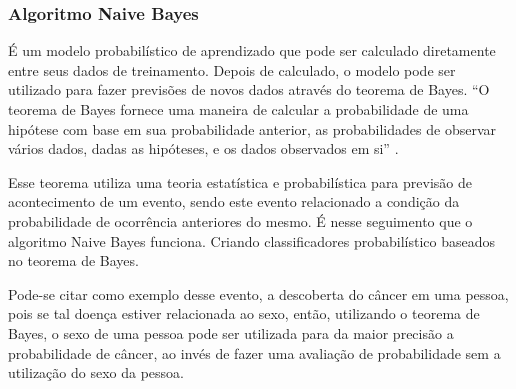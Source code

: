 % 
% 
%  
%  


\subsubsection{Algoritmo Naive Bayes}\label{cap:refTeor:sssec:nbayes}

É um modelo probabilístico de aprendizado que pode ser calculado diretamente entre seus dados de treinamento. Depois de calculado, o modelo pode ser utilizado para fazer previsões de novos dados através do teorema de Bayes. ``O teorema de Bayes fornece uma maneira de calcular a probabilidade de uma hipótese com base em sua probabilidade anterior, as probabilidades de observar vários dados, dadas as hipóteses, e os dados observados em si'' \cite[p. 156]{Mitchell1997}.



Esse teorema utiliza uma teoria estatística e probabilística para previsão de acontecimento de um evento, sendo este evento  relacionado a condição da probabilidade de ocorrência anteriores do mesmo. É nesse seguimento que o algoritmo Naive Bayes funciona. Criando classificadores  probabilístico baseados no teorema de Bayes.


Pode-se citar como exemplo desse evento, a descoberta do câncer em uma pessoa, pois se tal doença estiver relacionada ao sexo, então, utilizando o teorema de Bayes, o sexo de uma pessoa pode ser utilizada para da maior precisão a probabilidade de câncer, ao invés de fazer uma avaliação de probabilidade sem a utilização do sexo da pessoa.

